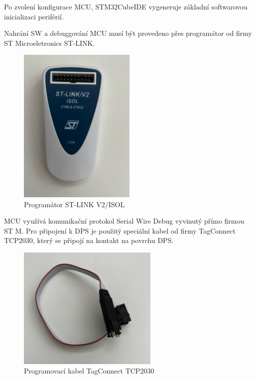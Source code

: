 Po zvolení konfigurace MCU, STM32CubeIDE vygeneruje základní softwarovou inicializaci periférií.
\par
Nahrání SW a debuggování MCU musí být provedeno přes programátor od firmy ST Microeletronics ST-LINK.
\begin{figure}[H]
    \caption{Programátor ST-LINK V2/ISOL}
    \includegraphics[width=0.5\textwidth]{pictures/stlink.jpg}
\end{figure}
MCU využívá komunikační protokol Serial Wire Debug vyvinutý přímo firmou ST M. Pro připojení k DPS je použitý speciální kabel od firmy TagConnect TCP2030, který se připojí na kontakt na povrchu DPS.
\begin{figure}[H]
    \caption{Programovací kabel TagConnect TCP2030}
    \includegraphics[width=0.6\textwidth]{pictures/tcp2030.jpg}
\end{figure}
